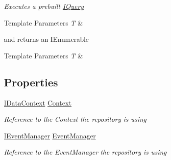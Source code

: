 \begin{DoxyCompactItemize}
\begin{DoxyCompactList}\small\item\em Executes a prebuilt \hyperlink{class_i_query-g}{I\-Query}
\begin{DoxyTemplParams}{Template Parameters}
{\em T} & \\
\hline
\end{DoxyTemplParams}
and returns an I\-Enumerable
\begin{DoxyTemplParams}{Template Parameters}
{\em T} & \\
\hline
\end{DoxyTemplParams}
\end{DoxyCompactList}\end{DoxyCompactItemize}
\subsection*{Properties}
\begin{DoxyCompactItemize}
\item 
\hyperlink{interface_framework_extension_1_1_core_1_1_interfaces_1_1_i_data_context}{I\-Data\-Context} \hyperlink{class_framework_extension_1_1_entity_framework_1_1_repositories_1_1_entity_framework_repository_ac6a6a10470ba73e14d4088fe62cf50c2}{Context}
\begin{DoxyCompactList}\small\item\em Reference to the Context the repository is using \end{DoxyCompactList}\item 
\hyperlink{interface_framework_extension_1_1_core_1_1_interfaces_1_1_i_event_manager}{I\-Event\-Manager} \hyperlink{class_framework_extension_1_1_entity_framework_1_1_repositories_1_1_entity_framework_repository_ab8e957acbf4423a277ba2adb60eb6815}{Event\-Manager}
\begin{DoxyCompactList}\small\item\em Reference to the Event\-Manager the repository is using \end{DoxyCompactList}\end{DoxyCompactItemize}


